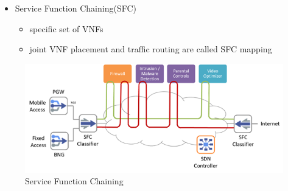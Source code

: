 \documentclass{beamer}
\begin{document}
\begin{frame}
	\begin{itemize}
		\item {Service Function Chaining(SFC)}	
		\begin{itemize}
			\item <1->{specific set of VNFs}
			\item <2->{joint VNF placement and traffic routing
				are called SFC mapping}	
		\end{itemize}
	\end{itemize}
\begin{figure}
	\centering
	\includegraphics[width=0.9\linewidth]{sfcexample}
	\caption{Service Function Chaining}
	\label{fig:sfcexample}
\end{figure}
\end{frame}
\end{document}
